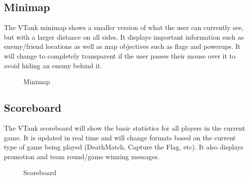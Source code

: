 \subsection{Minimap}

The VTank minimap shows a smaller version of what the user can currently see, but with a larger distance on all sides. It displays important information such as enemy/friend locations as well as map objectives such as flags and powerups. It will change to completely transparent if the user passes their mouse over it to avoid hiding an enemy behind it. 

\begin{figure}[htbp]
	\centering
	\caption{Minimap}
	\label{fig:mmap}
\end{figure}

\subsection{Scoreboard}

The VTank scoreboard will show the basic statistics for all players in the current game. It is updated in real time and will change formats based on the current type of game being played (DeathMatch, Capture the Flag, etc).  It also displays promotion and team round/game winning messages.

\begin{figure}[htbp]
	\centering
	\caption{Scoreboard}
	\label{fig:sboard}
\end{figure}

